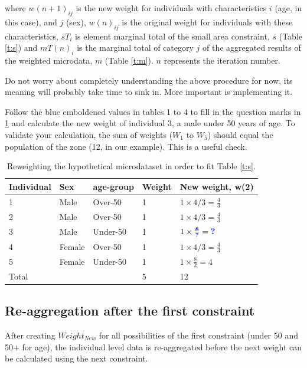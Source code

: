 \documentclass[a4paper, 11pt, twoside]{article}
\begin{document}
where $w(n+1)_{ij}$ is the new weight for individuals with characteristics $i$
(age, in this case), and $j$ (sex),  $w(n)_{ij}$ is the original
weight for individuals with these characteristics, $sT_{i}$ is element
marginal total of the small area constraint, $s$
(Table \ref{t:s}) and $mT(n)_{i}$ is the marginal total of category
$j$ of the aggregated results of the weighted
microdata, $m$ (Table \ref{t:m}).
$n$ represents the iteration number.

Do not worry about completely understanding the above procedure for now, its
meaning will probably take time to sink in.
More important is implementing it.

Follow the blue emboldened values in tables 1 to 4 to fill in the
question marks in \cref{t:new-weights} and calculate the new weight
of individual 3, a male under 50 years of age.
To validate your calculation, the sum of weights ($W_1$ to $W_5$)
should equal the population of the zone (12, in our example). This is a
useful check.

\begin{table}[htbp]
\centering
\caption{Reweighting the hypothetical microdataset in order to fit
Table \ref{t:s}.}
\begin{tabular}{lllll}
\toprule
{Individual} & {Sex} & {age-group} & {Weight} &
{New weight, w(2)} \\ \midrule
1 & Male & Over-50 & 1 & $1 \times 4/3 = \frac{4}{3}$ \\
2 & Male & Over-50 & 1 & $1 \times 4/3 = \frac{4}{3}$ \\
3 & Male & Under-50 & 1 & $1 \times \frac{\textbf{\color{blue}8}}{\textbf{\color{blue}?}} = \textbf{\color{blue}?}$ \\
4 & Female & Over-50 & 1 & $1 \times 4/3 = \frac{4}{3}$ \\
5 & Female & Under-50 & 1 & $1 \times \frac{8}{2} = 4$ \\
\midrule
Total & & & 5 & 12 \\
\bottomrule
\end{tabular}
\label{t:new-weights}
\end{table}

\subsection{Re-aggregation after the first constraint} \label{sreag}
After creating $Weight_{New}$ for all possibilities of the first constraint (under 50 and 50$+$ for age),
the individual level data is re-aggregated before the next weight can be calculated using the next constraint.
\end{document}
